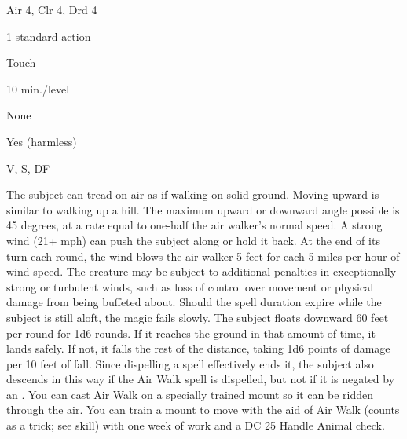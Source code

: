 
\begin{description*}
\item[Level:] Air 4, Clr 4, Drd 4
\item[Casting Time:] 1 standard action
\item[Range:] Touch
\item[Duration:] 10 min./level
\item[Saving Throw:] None
\item[Spell Resistance:] Yes (harmless)
\item[Components:] V, S, DF
\end{description*}

The subject can tread on air as if walking on solid ground. Moving upward is similar
to walking up a hill. The maximum upward or downward angle possible is 45 degrees,
at a rate equal to one-half the air walker's normal speed.
A strong wind (21+ mph) can push the subject along or hold it back. At the end
of its turn each round, the wind blows the air walker 5 feet for each 5 miles per
hour of wind speed. The creature may be subject to additional penalties in exceptionally
strong or turbulent winds, such as loss of control over movement or physical damage
from being buffeted about.
Should the spell duration expire while the subject is still aloft, the magic fails
slowly. The subject floats downward 60 feet per round for 1d6 rounds. If it reaches
the ground in that amount of time, it lands safely. If not, it falls the rest of
the distance, taking 1d6 points of damage per 10 feet of fall. Since dispelling
a spell effectively ends it, the subject also descends in this way if the Air Walk spell is dispelled, but not if it is negated by an .
You can cast Air Walk on a specially trained mount so it can be ridden
through the air. You can train a mount to move with the aid of Air Walk (counts as a trick; see  skill) with one week of work and a DC 25
Handle Animal check.